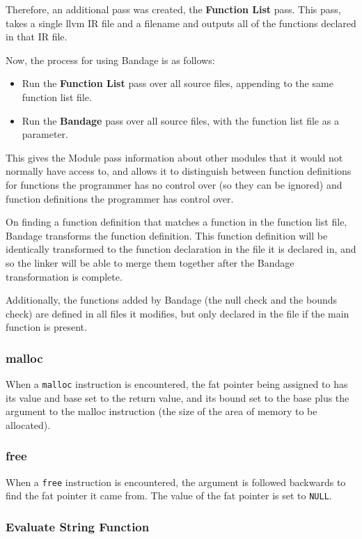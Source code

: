 Therefore, an additional pass was created, the \textbf{Function List} pass.
This pass, takes a single llvm IR file and a filename and outputs all of the functions declared in that IR file.

Now, the process for using Bandage is as follows:
\begin{itemize}
\item Run the \textbf{Function List} pass over all source files, appending to the same function list file.
\item Run the \textbf{Bandage} pass over all source files, with the function list file as a parameter.
\end{itemize}

This gives the Module pass information about other modules that it would not normally have access to, and allows it to distinguish between function definitions for functions the programmer has no control over (so they can be ignored) and function definitions the programmer has control over.

On finding a function definition that matches a function in the function list file, Bandage transforms the function definition.
This function definition will be identically transformed to the function declaration in the file it is declared in, and so the linker will be able to merge them together after the Bandage transformation is complete.

Additionally, the functions added by Bandage (the null check and the bounds check) are defined in all files it modifies, but only declared in the file if the main function is present.

\subsubsection{malloc}

When a \verb!malloc! instruction is encountered, the fat pointer being assigned to has its value and base set to the return value, and its bound set to the base plus the argument to the malloc instruction (the size of the area of memory to be allocated).

\subsubsection{free}
When a \verb!free! instruction is encountered, the argument is followed backwards to find the fat pointer it came from.
The value of the fat pointer is set to \verb!NULL!.
\subsubsection{Evaluate String Function}

